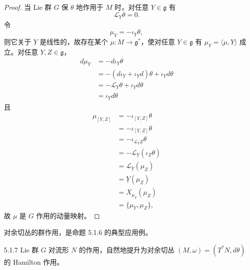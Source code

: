 \begin{proof}
  当 Lie 群 $G$ 保 $\theta$ 地作用于 $M$ 时，对任意 $Y\in\mathfrak{g}$ 有
  \begin{equation}
    \mathcal{L}_{\underline{Y}}\theta=0.
    \tag{5.1.32}
  \end{equation}
  令
  \begin{equation}
    \mu_Y=-\iota_{\underline{Y}}\theta,
    \tag{5.1.33}
  \end{equation}
  则它关于 $Y$ 是线性的，故存在某个 $\mu\colon M\to\mathfrak{g}^*$，使对任意 $Y\in\mathfrak{g}$ 有 $\mu_Y=\langle\mu,Y\rangle$ 成立。对任意 $Y,Z\in\mathfrak{g}$，
  \begin{align}
    d\mu_Y&=-d\iota_{\underline{Y}}\theta \tag{5.1.34}\\
    &=-(d\iota_{\underline{Y}}+\iota_{\underline{Y}}d)\theta+\iota_{\underline{Y}}d\theta \tag{5.1.35}\\
    &=-\mathcal{L}_{\underline{Y}}\theta+\iota_{\underline{Y}}d\theta \tag{5.1.36}\\
    &=\iota_{\underline{Y}}d\theta \tag{5.1.37}
  \end{align}
  且
  \begin{align}
    \mu_{[Y,Z]}&=-\iota_{\underline{[Y,Z]}}\theta \tag{5.1.38}\\
    &=-\iota_{[\underline{Y},\underline{Z}]}\theta \tag{5.1.39}\\
    &=-\iota_{\mathcal{L}_{\underline{Y}}\underline{Z}}\theta \tag{5.1.40}\\
    &=-\mathcal{L}_{\underline{Y}}(\iota_{\underline{Z}}\theta) \tag{5.1.41}\\
    &=\mathcal{L}_{\underline{Y}}(\mu_Z) \tag{5.1.42}\\
    &=\underline{Y}(\mu_Z) \tag{5.1.43}\\
    &=X_{\mu_Y}(\mu_Z) \tag{5.1.44}\\
    &=\{\mu_Y,\mu_Z\}, \tag{5.1.45}
  \end{align}
  故 $\mu$ 是 $G$ 作用的动量映射。
\end{proof}

对余切丛的群作用，是命题 5.1.6 的典型应用例。

\begin{proposition*}{5.1.7}
  Lie 群 $G$ 对流形 $N$ 的作用，自然地提升为对余切丛 $(M,\omega)=(T^*N,d\theta)$ 的 Hamilton 作用。
\end{proposition*}

